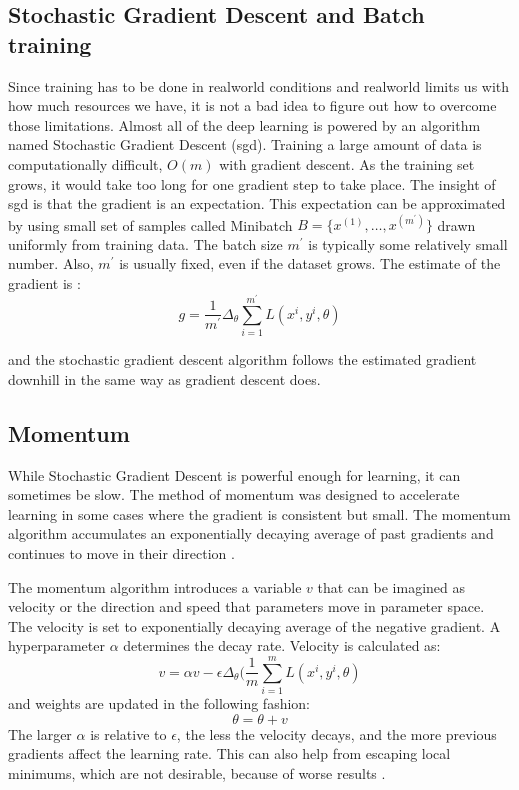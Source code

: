 \documentclass[thesis=B,english]{FITthesis}[2019/12/23]
\begin{document}
\subsection[SGD and Batch Training]{Stochastic Gradient Descent and Batch training}\label{sec:sgd}
    Since training has to be done in realworld conditions and realworld limits us with how much resources we have, it is not a bad idea to figure out how to overcome those limitations. Almost all of the deep learning is powered by an algorithm named Stochastic Gradient Descent (\gls{sgd}). Training a large amount of data is computationally difficult, $O(m)$ with gradient descent. As the training set grows, it would take too long for one gradient step to take place. The insight of \gls{sgd} is that the gradient is an expectation. This expectation can be approximated by using small set of samples called Minibatch $B = \{x^{(1)},\ldots, x^{(m^{'})}\}$ drawn uniformly from training data. The batch size $m^{'}$ is typically some relatively small number. Also, $m^{'}$ is usually fixed, even if the dataset grows. The estimate of the gradient is \cite{bengio2017deep}:
    $$g = \frac{1}{m^{'}}\Delta_{\theta}\sum_{i=1}^{m^{'}}L(x^{i}, y^{i},\theta)$$ 
    
    and the stochastic gradient descent algorithm follows the estimated gradient downhill in the same way as gradient descent does. 
    
\subsection{Momentum}
    While Stochastic Gradient Descent is powerful enough for learning, it can sometimes be slow. The method of momentum was designed to accelerate learning in some cases where the gradient is consistent but small. The momentum algorithm accumulates an exponentially decaying average of past gradients and continues to move in their direction \cite{bengio2017deep}.
    
    The momentum algorithm introduces a variable $v$ that can be imagined as velocity or the direction and speed that parameters move in parameter space. The velocity is set to exponentially decaying average of the negative gradient. A hyperparameter $\alpha$ determines the decay rate. Velocity is calculated as:
    $$v = \alpha v - \epsilon\Delta_{\theta}(\frac{1}{m} \sum_{i=1}^m L(x^i, y^i, \theta)$$
    and weights are updated in the following fashion:
    $$\theta = \theta + v$$
    The larger $\alpha$ is relative to $\epsilon$, the less the velocity decays, and the more previous gradients affect the learning rate. This can also help from escaping local minimums, which are not desirable, because of worse results \cite{bengio2017deep}.
\end{document}
